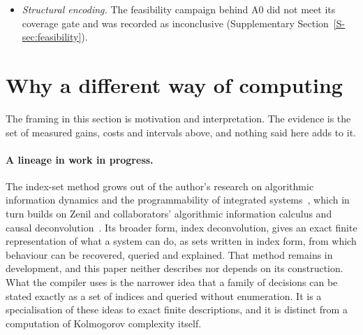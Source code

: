 \documentclass[11pt,a4paper]{article}
\begin{document}
\begin{itemize}
spirit of learned guidance for exact search~\cite{gasse2019}, lost to plain Hamming
order on all  of  fixtures, and in 
real compilations not one query collected the observations the learner needed
( of ). Round one's learning hypothesis had failed by
design: none of its  fixtures contained a test solution better than
the training minimum. The per-query learner is retired for this architecture.
\item \emph{Structural encoding.} The feasibility campaign behind A0 did not meet
its coverage gate and was recorded as inconclusive (Supplementary
Section~\ref{S-sec:feasibility}).
\end{itemize}

\section{Why a different way of computing}\label{sec:why}

The framing in this section is motivation and interpretation. The evidence is the
set of measured gains, costs and intervals above, and nothing said here adds to
it.

\paragraph{A lineage in work in progress.} The index-set method grows out of the
author's research on algorithmic information dynamics and the programmability of
integrated systems~\cite{hernandez2019aid,hernandez2021aid}, which in turn builds
on Zenil and collaborators' algorithmic information calculus and causal
deconvolution~\cite{zenil2017causality,zenil2019calculus,zenil2019deconvolution}.
Its broader form, index deconvolution, gives an exact finite representation of what
a system can do, as sets written in index form, from which behaviour can be
recovered, queried and explained. That method remains in development, and this
paper neither describes nor depends on its construction. What the compiler uses is
the narrower idea that a family of decisions can be stated exactly as a set of
indices and queried without enumeration. It is a specialisation of these ideas to
exact finite descriptions, and it is distinct from a computation of Kolmogorov
complexity itself.
\end{document}

